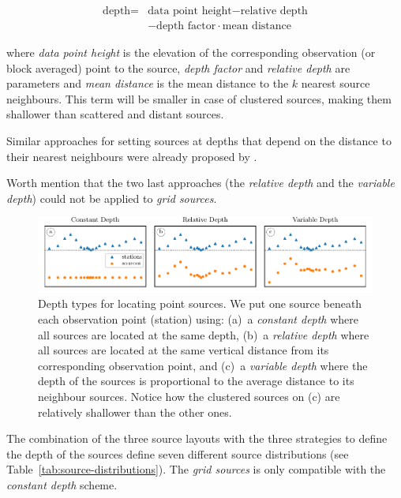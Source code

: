 \documentclass[twocolumn]{article}
\begin{document}
\begin{equation}
    \begin{split}
        \textrm{depth} =
           &\textrm{data point height} - \textrm{relative depth} \\
           &- \textrm{depth factor} \cdot \textrm{mean distance}
    \end{split}
\end{equation}

\noindent where \emph{data point height} is the elevation of the corresponding
observation (or block averaged) point to the source, \emph{depth factor} and
\emph{relative depth} are parameters and \emph{mean distance} is the mean
distance to the $k$ nearest source neighbours.
This term will be smaller in case of clustered sources, making them shallower
than scattered and distant sources.

Similar approaches for setting sources at depths that depend
on the distance to their nearest neighbours were already proposed by
\citet{cordell1992, guspi2004, guspi2009}.

Worth mention that the two last approaches (the \emph{relative depth} and the
\emph{variable depth}) could not be applied to \emph{grid sources}.


\begin{figure}
    \includegraphics[width=\linewidth]{figs/depth_types.pdf}
    \caption{
        Depth types for locating point sources. We put one source beneath each
        observation point (station) using:
        (a)~a \emph{constant depth} where all sources are located at the same
           depth,
        (b)~a \emph{relative depth} where all sources are located at the same
           vertical distance from its corresponding observation point, and
        (c)~a \emph{variable depth} where the depth of the sources is
           proportional to the average distance to its neighbour sources.
           Notice how the clustered sources on (c) are relatively shallower
           than the
           other ones.
    }
    \label{fig:depth-types}
\end{figure}

The combination of the three source layouts with the three strategies to define
the depth of the sources define seven different source distributions (see
Table~\ref{tab:source-distributions}).
The \emph{grid sources} is only compatible with the \emph{constant depth}
scheme.
\end{document}
